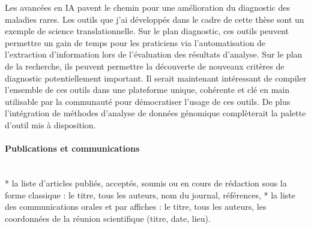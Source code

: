 Les avancées en IA pavent le chemin pour une amélioration du diagnostic des maladies rares. Les outils que j’ai développés dans le cadre de cette thèse sont un exemple de science translationnelle. Sur le plan diagnostic, ces outils peuvent permettre un gain de temps pour les praticiens via l’automatisation de l’extraction d’information lors de l’évaluation des résultats d’analyse. Sur le plan de la recherche, ils peuvent permettre la découverte de nouveaux critères de diagnostic potentiellement important. Il serait maintenant intéressant de compiler l’ensemble de ces outils dans une plateforme unique, cohérente et clé en main utilisable par la communauté pour démocratiser l’usage de ces outils. De plus l’intégration de méthodes d’analyse de données génomique complèterait la palette d’outil mis à disposition.

\paragraph{\textbf{Publications et communications}}\mbox{}\\
* la liste d’articles publiés, acceptés, soumis ou en cours de rédaction sous la forme classique : le titre, tous les auteurs, nom du journal, références,
* la liste des communications orales et par affiches : le titre, tous les auteurs, les coordonnées de la réunion scientifique (titre, date, lieu).